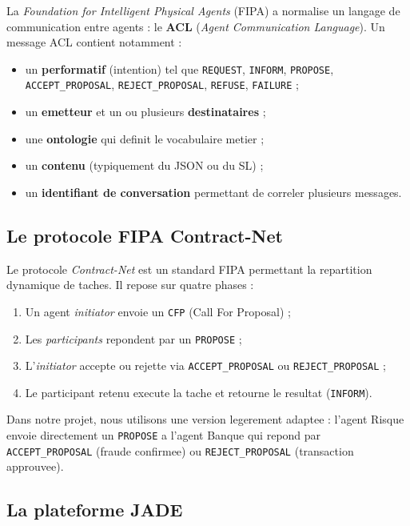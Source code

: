 \documentclass[12pt,a4paper,oneside]{report}
\begin{document}
La \emph{Foundation for Intelligent Physical Agents} (FIPA) a normalise un
langage de communication entre agents : le \textbf{ACL} (\emph{Agent
Communication Language}). Un message ACL contient notamment :

\begin{itemize}[leftmargin=*]
  \item un \textbf{performatif} (intention) tel que \texttt{REQUEST},
        \texttt{INFORM}, \texttt{PROPOSE}, \texttt{ACCEPT\_PROPOSAL},
        \texttt{REJECT\_PROPOSAL}, \texttt{REFUSE}, \texttt{FAILURE} ;
  \item un \textbf{emetteur} et un ou plusieurs \textbf{destinataires} ;
  \item une \textbf{ontologie} qui definit le vocabulaire metier ;
  \item un \textbf{contenu} (typiquement du JSON ou du SL) ;
  \item un \textbf{identifiant de conversation} permettant de correler
        plusieurs messages.
\end{itemize}

\subsection{Le protocole FIPA Contract-Net}

Le protocole \emph{Contract-Net} \cite{smith1980contract} est un standard
FIPA permettant la repartition dynamique de taches. Il repose sur quatre
phases :

\begin{enumerate}[leftmargin=*]
  \item Un agent \emph{initiator} envoie un \texttt{CFP} (Call For Proposal) ;
  \item Les \emph{participants} repondent par un \texttt{PROPOSE} ;
  \item L'\emph{initiator} accepte ou rejette via \texttt{ACCEPT\_PROPOSAL}
        ou \texttt{REJECT\_PROPOSAL} ;
  \item Le participant retenu execute la tache et retourne le resultat
        (\texttt{INFORM}).
\end{enumerate}

Dans notre projet, nous utilisons une version legerement adaptee : l'agent
Risque envoie directement un \texttt{PROPOSE} a l'agent Banque qui repond par
\texttt{ACCEPT\_PROPOSAL} (fraude confirmee) ou \texttt{REJECT\_PROPOSAL}
(transaction approuvee).

\subsection{La plateforme JADE}
\end{document}
